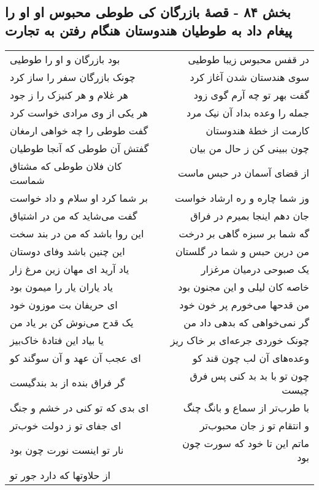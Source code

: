 \begin{center}
\section*{بخش ۸۴ - قصهٔ بازرگان کی طوطی محبوس او او را پیغام داد به طوطیان هندوستان هنگام رفتن به تجارت}
\label{sec:sh084}
\begin{longtable}{l p{0.5cm} r}
بود بازرگان و او را طوطیی
&&
در قفس محبوس زیبا طوطیی
\\
چونک بازرگان سفر را ساز کرد
&&
سوی هندستان شدن آغاز کرد
\\
هر غلام و هر کنیزک را ز جود
&&
گفت بهر تو چه آرم گوی زود
\\
هر یکی از وی مرادی خواست کرد
&&
جمله را وعده بداد آن نیک مرد
\\
گفت طوطی را چه خواهی ارمغان
&&
کارمت از خطهٔ هندوستان
\\
گفتش آن طوطی که آنجا طوطیان
&&
چون ببینی کن ز حال من بیان
\\
کان فلان طوطی که مشتاق شماست
&&
از قضای آسمان در حبس ماست
\\
بر شما کرد او سلام و داد خواست
&&
وز شما چاره و ره ارشاد خواست
\\
گفت می‌شاید که من در اشتیاق
&&
جان دهم اینجا بمیرم در فراق
\\
این روا باشد که من در بند سخت
&&
گه شما بر سبزه گاهی بر درخت
\\
این چنین باشد وفای دوستان
&&
من درین حبس و شما در گلستان
\\
یاد آرید ای مهان زین مرغ زار
&&
یک صبوحی درمیان مرغزار
\\
یاد یاران یار را میمون بود
&&
خاصه کان لیلی و این مجنون بود
\\
ای حریفان بت موزون خود
&&
من قدحها می‌خورم پر خون خود
\\
یک قدح می‌نوش کن بر یاد من
&&
گر نمی‌خواهی که بدهی داد من
\\
یا بیاد این فتادهٔ خاک‌بیز
&&
چونک خوردی جرعه‌ای بر خاک ریز
\\
ای عجب آن عهد و آن سوگند کو
&&
وعده‌های آن لب چون قند کو
\\
گر فراق بنده از بد بندگیست
&&
چون تو با بد بد کنی پس فرق چیست
\\
ای بدی که تو کنی در خشم و جنگ
&&
با طرب‌تر از سماع و بانگ چنگ
\\
ای جفای تو ز دولت خوب‌تر
&&
و انتقام تو ز جان محبوب‌تر
\\
نار تو اینست نورت چون بود
&&
ماتم این تا خود که سورت چون بود
\\
از حلاوتها که دارد جور تو

\end{longtable}
\end{center}
